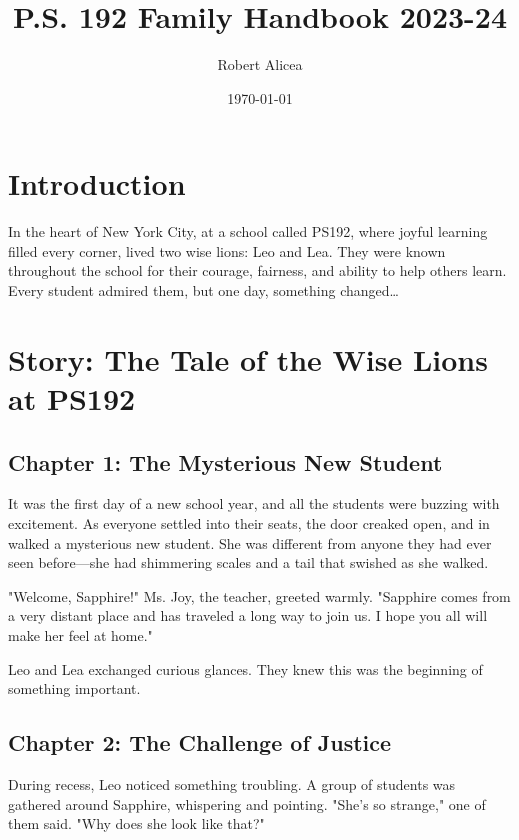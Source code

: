 \documentclass[11pt]{article}
\author{Robert Alicea}
\date{\today}
\title{P.S. 192 Family Handbook 2023-24}
\begin{document}


\pagenumbering{\fancyhf{}}
\pagestyle{headings}

\fancyhead[R]{\thepage}

\pagestyle{fancy}
\renewcommand{\footrulewidth}{1px}


\clearpage
\clearpage \tableofcontents \clearpage

\section{Introduction}
\label{sec:org400d7b1}
In the heart of New York City, at a school called PS192, where joyful learning filled every corner, lived two wise lions: Leo and Lea. They were known throughout the school for their courage, fairness, and ability to help others learn. Every student admired them, but one day, something changed…

\section{Story: The Tale of the Wise Lions at PS192}
\label{sec:org346b0e5}

\subsection{Chapter 1: The Mysterious New Student}
\label{sec:orgb2bdfac}
It was the first day of a new school year, and all the students were buzzing with excitement. As everyone settled into their seats, the door creaked open, and in walked a mysterious new student. She was different from anyone they had ever seen before—she had shimmering scales and a tail that swished as she walked.

"Welcome, Sapphire!" Ms. Joy, the teacher, greeted warmly. "Sapphire comes from a very distant place and has traveled a long way to join us. I hope you all will make her feel at home."

Leo and Lea exchanged curious glances. They knew this was the beginning of something important.

\subsection{Chapter 2: The Challenge of Justice}
\label{sec:orgc5e9b50}
During recess, Leo noticed something troubling. A group of students was gathered around Sapphire, whispering and pointing. "She’s so strange," one of them said. "Why does she look like that?"
\end{document}
